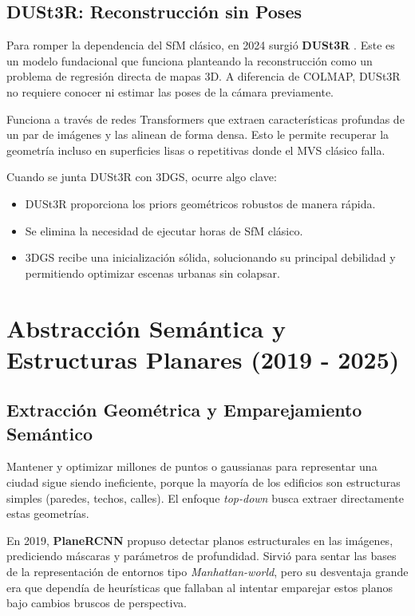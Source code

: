 \subsection{DUSt3R: Reconstrucción sin Poses}

Para romper la dependencia del SfM clásico, en 2024 surgió \textbf{DUSt3R} \cite{wang2024dust3r}. Este es un modelo fundacional que funciona planteando la reconstrucción como un problema de regresión directa de mapas 3D. A diferencia de COLMAP, DUSt3R no requiere conocer ni estimar las poses de la cámara previamente.

Funciona a través de redes Transformers que extraen características profundas de un par de imágenes y las alinean de forma densa. Esto le permite recuperar la geometría incluso en superficies lisas o repetitivas donde el MVS clásico falla. 

Cuando se junta DUSt3R con 3DGS, ocurre algo clave:
\begin{itemize}
    \item DUSt3R proporciona los priors geométricos robustos de manera rápida.
    \item Se elimina la necesidad de ejecutar horas de SfM clásico.
    \item 3DGS recibe una inicialización sólida, solucionando su principal debilidad y permitiendo optimizar escenas urbanas sin colapsar.
\end{itemize}

\section{Abstracción Semántica y Estructuras Planares (2019 - 2025)}

\subsection{Extracción Geométrica y Emparejamiento Semántico}

Mantener y optimizar millones de puntos o gaussianas para representar una ciudad sigue siendo ineficiente, porque la mayoría de los edificios son estructuras simples (paredes, techos, calles). El enfoque \textit{top-down} busca extraer directamente estas geometrías.

En 2019, \textbf{PlaneRCNN} \cite{liu2019planercnn} propuso detectar planos estructurales en las imágenes, prediciendo máscaras y parámetros de profundidad. Sirvió para sentar las bases de la representación de entornos tipo \textit{Manhattan-world}, pero su desventaja grande era que dependía de heurísticas que fallaban al intentar emparejar estos planos bajo cambios bruscos de perspectiva.

